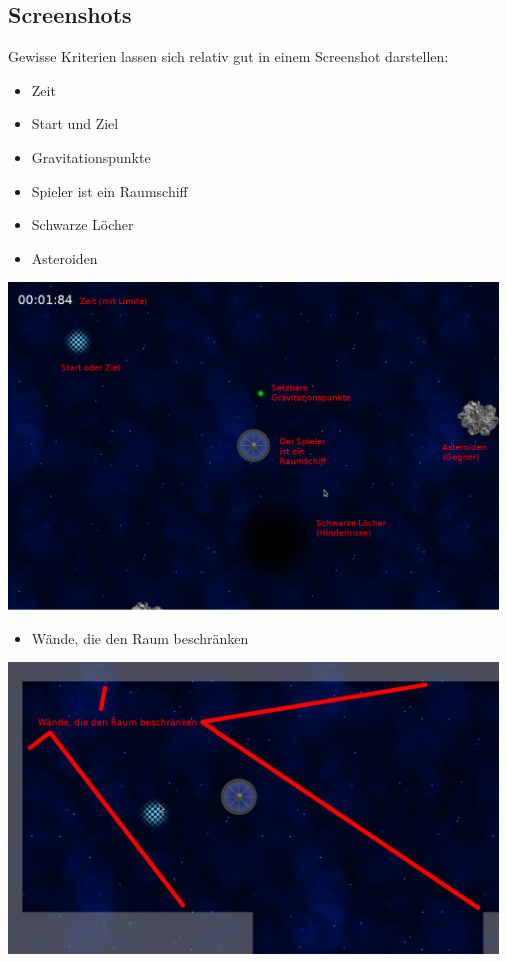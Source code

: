 \documentclass[12pt,a4paper]{scrartcl}
\begin{document}
\subsection{Screenshots}
Gewisse Kriterien lassen sich relativ gut in einem Screenshot darstellen:\\
\begin{itemize}
\item Zeit
\item Start und Ziel
\item Gravitationspunkte
\item Spieler ist ein Raumschiff
\item Schwarze Löcher
\item Asteroiden
\end{itemize}
\includegraphics[width=13cm]{img/kriterien.png}\\

\begin{itemize}
\item Wände, die den Raum beschränken
\end{itemize}
\includegraphics[width=13cm]{img/waende.png}\\
\end{document}
